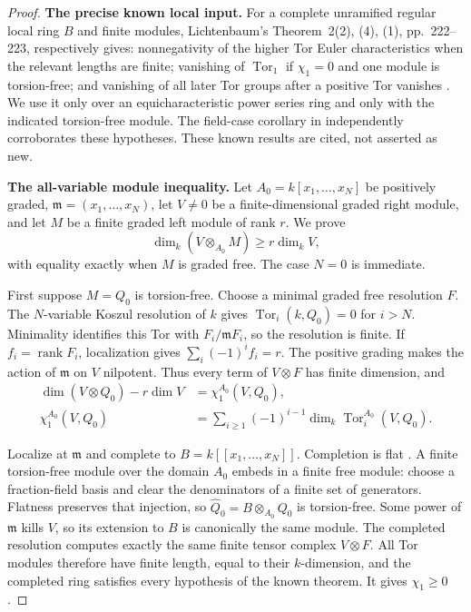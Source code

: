\documentclass[11pt,a4paper]{article}
\theoremstyle{named}\newtheorem{finding}{Finding}[section]
\theoremstyle{definition}\newtheorem{definition}[finding]{Definition}
\theoremstyle{remark}\newtheorem{remark}[finding]{Remark}
\begin{document}
\begin{proof}
\par\smallskip\noindent\textbf{The precise known local input.}\quad
For a complete unramified regular local ring \(B\)
and finite modules, Lichtenbaum's
Theorem~2(2), (4), (1), pp.~222--223, respectively gives:
nonnegativity of the higher Tor Euler characteristics
when the relevant lengths are finite;
vanishing of \(\operatorname{Tor}_1\) if
\(\chi_1=0\) and one module is torsion-free;
and vanishing of all later Tor groups after a
positive Tor vanishes \cite{LichtenbaumTor}.
We use it only over an equicharacteristic power
series ring and only with the indicated torsion-free
module. The field-case corollary in
\cite[supplementary lecture April~18, p.~169]{Hochster615}
independently corroborates these hypotheses.
These known results are cited, not asserted as new.

\par\smallskip\noindent\textbf{The all-variable module inequality.}\quad
Let \(A_0=k[x_1,\ldots,x_N]\) be positively graded,
\(\mathfrak m=(x_1,\ldots,x_N)\), let \(V\ne0\) be
a finite-dimensional graded right module, and let
\(M\) be a finite graded left module of rank \(r\).
We prove
\begin{equation}\label{eq:allRankTensorDimension}
 \dim_k(V\otimes_{A_0}M)\ge r\dim_kV,
\end{equation}
with equality exactly when \(M\) is graded free.
The case \(N=0\) is immediate.

First suppose \(M=Q_0\) is torsion-free.
Choose a minimal graded free resolution \(F\).
The \(N\)-variable Koszul resolution of \(k\) gives
\(\operatorname{Tor}_i(k,Q_0)=0\) for \(i>N\).
Minimality identifies this Tor with
\(F_i/\mathfrak mF_i\), so the resolution is finite.
If \(f_i=\operatorname{rank}F_i\), localization
gives \(\sum_i(-1)^if_i=r\).
The positive grading makes the action of
\(\mathfrak m\) on \(V\) nilpotent. Thus every
term of \(V\otimes F\) has finite dimension, and
\begin{equation}\label{eq:allRankChiOne}
 \begin{split}
 \dim(V\otimes Q_0)-r\dim V
 &=\chi_1^{A_0}(V,Q_0),\\
 \chi_1^{A_0}(V,Q_0)
 &=\sum_{i\ge1}(-1)^{i-1}
               \dim_k\operatorname{Tor}_i^{A_0}(V,Q_0).
 \end{split}
\end{equation}

Localize at \(\mathfrak m\) and complete to
\(B=k[[x_1,\ldots,x_N]]\). Completion is flat
\cite[Lemmas~10.97.2--10.97.3, tags 00MB--00MC]{StacksCompletion}.
A finite torsion-free module over the domain \(A_0\)
embeds in a finite free module: choose a fraction-field
basis and clear the denominators of a finite set of
generators. Flatness preserves that injection, so
\(\widehat Q_0=B\otimes_{A_0}Q_0\) is torsion-free.
Some power of \(\mathfrak m\) kills \(V\), so its
extension to \(B\) is canonically the same module.
The completed resolution computes exactly the
same finite tensor complex \(V\otimes F\).
All Tor modules therefore have finite length, equal
to their \(k\)-dimension, and the completed ring
satisfies every hypothesis of the known theorem.
It gives \(\chi_1\ge0\).


\end{proof}
\end{document}
